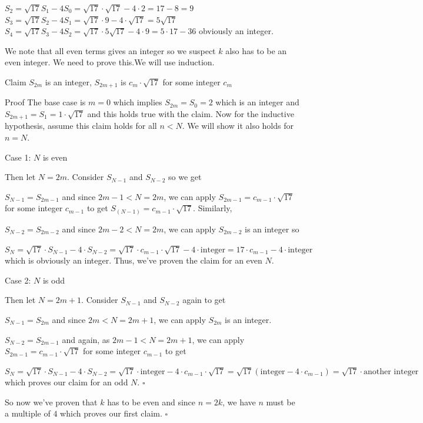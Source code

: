 \begin{enumerate}
 $S_2 = \sqrt{17} S_1 - 4 S_0 = \sqrt{17} \cdot \sqrt{17} - 4 \cdot 2 = 17 - 8 = 9$
$S_3 = \sqrt{17} S_2 - 4 S_1 = \sqrt{17} \cdot 9 - 4 \cdot \sqrt{17} = 5\sqrt{17}$
$S_4 = \sqrt{17} S_3 - 4 S_2 = \sqrt{17} \cdot 5 \sqrt{17} - 4 \cdot 9 = 5 \cdot 17 - 36$ obviously an integer.

 We note that all even terms gives an integer so we suspect $k$ also has to be an even integer. We need to prove this.We will use induction.

 Claim $S_{2m}$ is an integer, $S_{2m + 1}$ is $c_m \cdot \sqrt{17}$ for some integer $c_m$

 Proof The base case is $m = 0$ which implies $S_{2m} = S_0 = 2$ which is an integer and $S_{2m + 1} = S_1 = 1 \cdot \sqrt{17}$ and this holds true with the claim. Now for the inductive hypothesis, assume this claim holds for all $n < N$. We will show it also holds for $n = N$.

 Case 1: $N$ is even

 Then let $N = 2m$. Consider $S_{N - 1}$ and $S_{N - 2}$ so we get

 $S_{N - 1} = S_{2m - 1}$ and since $2m - 1 < N = 2m$, we can apply $S_{2m - 1} =  c_{m - 1} \cdot \sqrt{17}$ for some integer $c_{m - 1}$ to get $S_(N - 1) = c_{m - 1} \cdot \sqrt{17}$. Similarly,

 $S_{N - 2} = S_{2m - 2}$ and since $2m - 2 < N = 2m$, we can apply $S_{2m - 2}$ is an integer so

 $S_N = \sqrt{17} \cdot S_{N - 1} - 4 \cdot S_{N - 2} = \sqrt{17} \cdot c_{m - 1} \cdot \sqrt{17} - 4 \cdot \text{integer} = 17 \cdot c_{m - 1} - 4 \cdot \text{integer}$ which is obviously an integer. Thus, we've proven the claim for an even $N$.

 Case 2: $N$ is odd

 Then let $N = 2m + 1$. Consider $S_{N - 1}$ and $S_{N - 2}$ again to get

 $S_{N - 1} = S_{2m}$ and since $2m < N = 2m + 1$, we can apply $S_{2m}$ is an integer.

 $S_{N - 2} = S_{2m - 1}$ and again, as $2m - 1 < N = 2m + 1$, we can apply $S_{2m - 1} = c_{m - 1} \cdot \sqrt{17}$ for some integer $c_{m - 1}$ to get

 $S_N = \sqrt{17} \cdot S_{N - 1} - 4 \cdot S_{N - 2} = \sqrt{17} \cdot \text{integer} - 4 \cdot c_{m - 1} \cdot \sqrt{17} = \sqrt{17}(\text{integer} - 4 \cdot c_{m - 1}) = \sqrt{17} \cdot \text{another integer}$ which proves our claim for an odd $N$. $\square$

 So now we've proven that $k$ has to be even and since $n = 2k$, we have $n$ must be a multiple of $4$ which proves our first claim. $\square$


\end{enumerate}
